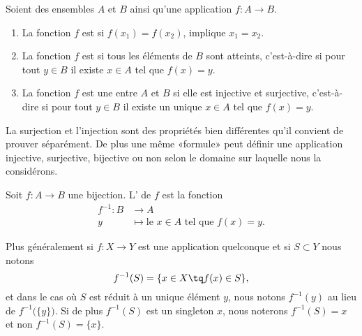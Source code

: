 \begin{definition}        \label{DEFooBFCQooPyKvRK}
    Soient des ensembles \( A\) et \( B\) ainsi qu'une application \( f\colon A\to B\).
    \begin{enumerate}
        \item
            La fonction \( f\) est  si \( f(x_1)=f(x_2)\), implique \( x_1=x_2\).
        \item
            La fonction \( f\) est  si tous les éléments de \( B\) sont atteints, c'est-à-dire si pour tout \( y\in B\) il existe \( x\in A\) tel que \( f(x)=y\).
        \item
            La fonction \( f\) est une  entre \( A\) et \( B\) si elle est injective et surjective, c'est-à-dire si pour tout \( y\in B\) il existe un unique \( x\in A\) tel que \( f(x)=y\).
    \end{enumerate}
\end{definition}
La surjection et l'injection sont des propriétés bien différentes qu'il convient de prouver séparément. De plus une même «formule» peut définir une application injective, surjective, bijective ou non selon le domaine sur laquelle nous la considérons.

\begin{definition}      \label{DEFooTRGYooRxORpY}
    Soit \( f\colon A\to B\) une bijection. L' de \( f\) est la fonction
    \begin{equation}
        \begin{aligned}
            f^{-1}\colon B&\to A \\
            y&\mapsto \text{le } x\in A\text{ tel que } f(x)=y.
        \end{aligned}
    \end{equation}
\end{definition}

Plus généralement si \( f\colon X\to Y\) est une application quelconque et si \( S\subset Y\) nous notons
\begin{equation}
    f^{-1}(S)=\{ x\in X\tq f(x)\in S \},
\end{equation}
et dans le cas où \( S\) est réduit à un unique élément \( y\), nous notons \( f^{-1}(y)\) au lieu de \( f^{-1}\big( \{ y \} \big)\). Si de plus \( f^{-1}(S)\) est un singleton \( x\), nous noterons \( f^{-1}(S)=x\) et non \( f^{-1}(S)=\{ x \}\).


